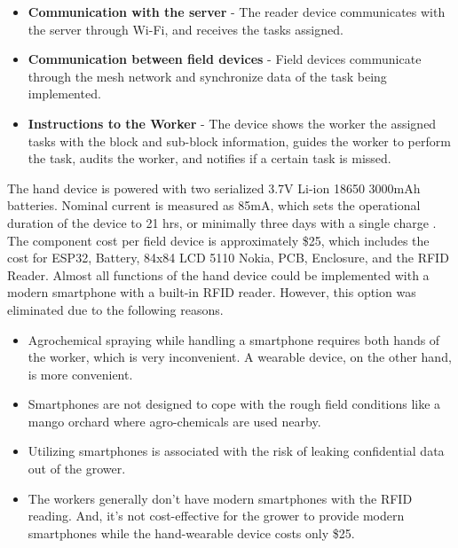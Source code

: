 \documentclass[journal]{IEEEtran}
\begin{document}
\begin{itemize}
\item \textbf{Communication with the server} - The reader device communicates with the server through Wi-Fi, and receives the tasks assigned.
\item \textbf{Communication between field devices} - Field devices communicate through the mesh network and synchronize data of the task being implemented.
\item \textbf{Instructions to the Worker} - The device shows the worker the assigned tasks with the block and sub-block information, guides the worker to perform the task, audits the worker, and notifies if a certain task is missed.
\end{itemize}
	The hand device is powered with two serialized 3.7V Li-ion 18650 3000mAh batteries. Nominal current is measured as 85mA, which sets the operational duration of the device to 21 hrs, or minimally three days with a single charge \cite{power}. The component cost per field device is approximately \$25, which includes the cost for ESP32, Battery, 84x84 LCD 5110 Nokia, PCB, Enclosure, and the RFID Reader. Almost all functions of the hand device could be implemented with a modern smartphone with a built-in RFID reader. However, this option was eliminated due to the following reasons.
	\begin{itemize}
		\item Agrochemical spraying while handling a smartphone requires both hands of the worker, which is very inconvenient. A wearable device, on the other hand, is more convenient.
		\item Smartphones are not designed to cope with the rough field conditions like a mango orchard where agro-chemicals are used nearby.
		\item Utilizing smartphones is associated with the risk of leaking confidential data out of the grower.
		\item The workers generally don't have modern smartphones with the RFID reading. And, it's not cost-effective for the grower to provide modern smartphones while the hand-wearable device costs only \$25.
	\end{itemize}
\end{document}
